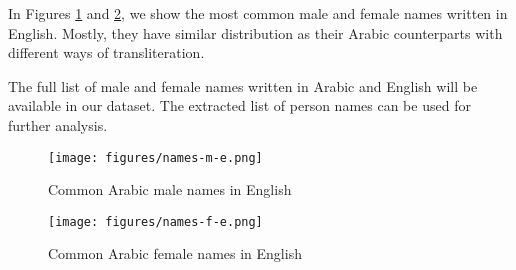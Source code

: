 \documentclass[sigconf,authorversion,nonacm]{acmart}
\begin{document}
In Figures \ref{fig:names-m-e} and \ref{fig:names-f-e}, we show the most common male and female names written in English. Mostly, they have similar distribution as their Arabic counterparts with different ways of transliteration.

The full list of male and female names written in Arabic and English will be available in our dataset. The extracted list of person names can be used for further analysis.




\begin{figure}[h]
	\begin{center}
		\texttt{[image: figures/names-m-e.png]} 
		\caption{Common Arabic male names in English}
		\label{fig:names-m-e}
	\end{center}
\end{figure}

\begin{figure}[h]
	\begin{center}
		\texttt{[image: figures/names-f-e.png]} 
		\caption{Common Arabic female names in English}
		\label{fig:names-f-e}
	\end{center}
\end{figure}
\end{document}
